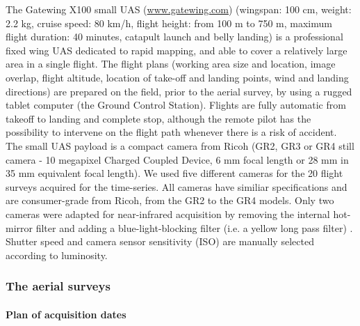 \documentclass[remotesensing,article,submit,moreauthors,pdftex,12pt,a4paper]{mdpi} %
\begin{document}
The Gatewing X100 small UAS (\url{www.gatewing.com}) (wingspan: 100 cm, weight: 2.2 kg, cruise speed: 80 km/h, flight height: from 100 m to 750 m, maximum flight duration: 40 minutes, catapult launch and belly landing) is a professional fixed wing UAS dedicated to rapid mapping, and able to cover a relatively large area in a single flight. The flight plans (working area size and location, image overlap, flight altitude, location of take-off and landing points, wind and landing directions) are prepared on the field, prior to the aerial survey, by using a rugged tablet computer (the Ground Control Station). Flights are fully automatic from takeoff to landing and complete stop, although the remote pilot has the possibility to intervene on the flight path whenever there is a risk of accident. 
The small UAS payload is a compact camera from Ricoh (GR2, GR3 or GR4 still camera - 10 megapixel Charged Coupled Device, 6 mm focal length or 28 mm in 35 mm equivalent focal length). We used five different cameras for the 20 flight surveys acquired for the time-series. All cameras have similiar specifications and are consumer-grade from Ricoh, from the GR2 to the GR4 models. Only two cameras were adapted for near-infrared acquisition by removing the internal hot-mirror filter and adding a blue-light-blocking filter (i.e. a yellow long pass filter) \citep{aber_small-format_2010}. Shutter speed and camera sensor sensitivity (ISO) are manually selected according to luminosity.


\subsubsection{The aerial surveys}

\paragraph{Plan of acquisition dates}
\end{document}
